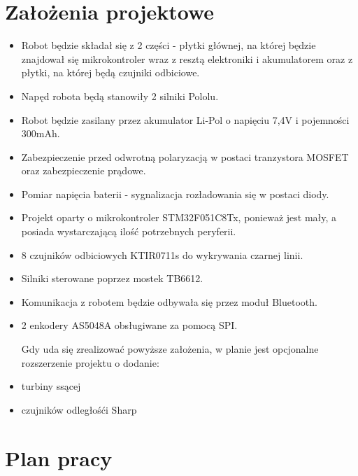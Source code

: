 \documentclass[12pt,a4paper]{article}
\begin{document}
\section{Założenia projektowe}
\begin{itemize}

\item Robot będzie składał się z 2 części - płytki głównej, na której będzie znajdował się mikrokontroler wraz z resztą elektroniki i akumulatorem oraz z płytki, na której będą czujniki odbiciowe. 

\item Napęd robota będą stanowiły 2 silniki Pololu.

\item Robot będzie zasilany przez akumulator Li-Pol o napięciu 7,4V i pojemności 300mAh.

\item Zabezpieczenie przed odwrotną polaryzacją w postaci tranzystora MOSFET oraz zabezpieczenie prądowe.

\item Pomiar napięcia baterii - sygnalizacja rozładowania się w postaci diody.

\item Projekt oparty o mikrokontroler STM32F051C8Tx, ponieważ jest mały, a posiada wystarczającą ilość potrzebnych peryferii.

\item 8 czujników odbiciowych KTIR0711s do wykrywania czarnej linii.

\item Silniki sterowane poprzez mostek TB6612.

\item Komunikacja z robotem będzie odbywała się przez moduł Bluetooth. 

\item 2 enkodery AS5048A obsługiwane za pomocą SPI.


Gdy uda się zrealizować powyższe założenia, w planie jest opcjonalne rozszerzenie projektu o dodanie:


\item turbiny ssącej

\item czujników odległośći Sharp


\end{itemize}

\section{Plan pracy}
\end{document}

